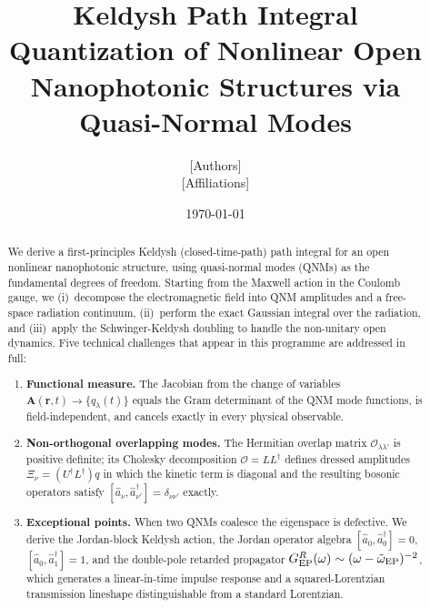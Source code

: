 \documentclass[12pt]{article}
\begin{document}
\title{\textbf{Keldysh Path Integral Quantization of Nonlinear Open
Nanophotonic Structures via Quasi-Normal Modes}}

\author{[Authors]\\[0.3em]
\small [Affiliations]}
\date{\today}
\maketitle

\begin{abstract}
We derive a first-principles Keldysh (closed-time-path) path integral
for an open nonlinear nanophotonic structure, using quasi-normal modes
(QNMs) as the fundamental degrees of freedom.  Starting from the Maxwell
action in the Coulomb gauge, we (i)~decompose the electromagnetic field
into QNM amplitudes and a free-space radiation continuum, (ii)~perform
the exact Gaussian integral over the radiation, and (iii)~apply the
Schwinger-Keldysh doubling to handle the non-unitary open dynamics.
Five technical challenges that appear in this programme are addressed in
full:

\begin{enumerate}
\item \textbf{Functional measure.}  The Jacobian from the change of
  variables $\mathbf{A}(\mathbf{r},t)\!\to\!\{q_\lambda(t)\}$ equals the
  Gram determinant of the QNM mode functions, is field-independent, and
  cancels exactly in every physical observable.

\item \textbf{Non-orthogonal overlapping modes.}  The Hermitian overlap
  matrix $\mathcal{O}_{\lambda\lambda'}$ is positive definite; its
  Cholesky decomposition $\mathcal{O}=LL^\dagger$ defines dressed
  amplitudes $\Xi_\nu=(U^\dagger L^\dagger)q$ in which the kinetic term
  is diagonal and the resulting bosonic operators satisfy
  $[\hat{a}_\nu,\hat{a}_{\nu'}^\dagger]=\delta_{\nu\nu'}$ exactly.

\item \textbf{Exceptional points.}  When two QNMs coalesce the
  eigenspace is defective.  We derive the Jordan-block Keldysh action,
  the Jordan operator algebra $[\hat{a}_0,\hat{a}_0^\dagger]=0$,
  $[\hat{a}_0,\hat{a}_1^\dagger]=1$, and the double-pole retarded
  propagator $G^R_{\rm EP}(\omega)\sim(\omega-\tilde{\omega}_{\rm EP})^{-2}$,
  which generates a linear-in-time impulse response and a
  squared-Lorentzian transmission lineshape distinguishable from
  a standard Lorentzian.


\end{enumerate}
\end{abstract}
\end{document}
